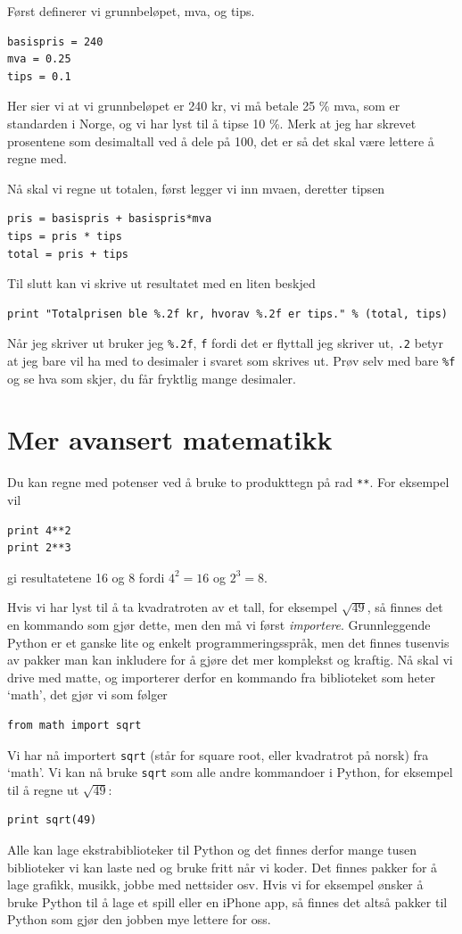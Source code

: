 \documentclass[a4paper, 11pt, notitlepage]{article}
\begin{document}
Først definerer vi grunnbeløpet, mva, og tips. 
\begin{lstlisting}
basispris = 240
mva = 0.25
tips = 0.1
\end{lstlisting}
Her sier vi at vi grunnbeløpet er 240 kr, vi må betale 25 \% mva, som er standarden i Norge, og vi har lyst til å tipse 10 \%. Merk at jeg har skrevet prosentene som desimaltall ved å dele på 100, det er så det skal være lettere å regne med.

Nå skal vi regne ut totalen, først legger vi inn mvaen, deretter tipsen
\begin{lstlisting}
pris = basispris + basispris*mva
tips = pris * tips
total = pris + tips
\end{lstlisting}

Til slutt kan vi skrive ut resultatet med en liten beskjed
\begin{lstlisting}
print "Totalprisen ble %.2f kr, hvorav %.2f er tips." % (total, tips)
\end{lstlisting}
Når jeg skriver ut bruker jeg \verb+%.2f+, \verb+f+ fordi det er flyttall jeg skriver ut, \verb+.2+ betyr at jeg bare vil ha med to desimaler i svaret som skrives ut. Prøv selv med bare \verb+%f+ og se hva som skjer, du får fryktlig mange desimaler.

\section*{Mer avansert matematikk}

Du kan regne med potenser ved å bruke to produkttegn på rad \verb+**+. For eksempel vil
\begin{lstlisting}
print 4**2
print 2**3
\end{lstlisting}
gi resultatetene 16 og 8 fordi $4^2=16$ og $2^3 = 8$.

Hvis vi har lyst til å ta kvadratroten av et tall, for eksempel $\sqrt{49}$, så finnes det en kommando som gjør dette, men den må vi først \emph{importere}. Grunnleggende Python er et ganske lite og enkelt programmeringsspråk, men det finnes tusenvis av pakker man kan inkludere for å gjøre det mer komplekst og kraftig. Nå skal vi drive med matte, og importerer derfor en kommando fra biblioteket som heter `math', det gjør vi som følger
\begin{lstlisting}
from math import sqrt
\end{lstlisting}
Vi har nå importert \verb+sqrt+ (står for square root, eller kvadratrot på norsk) fra `math'. Vi kan nå bruke \verb+sqrt+ som alle andre kommandoer i Python, for eksempel til å regne ut $\sqrt{49}$:
\begin{lstlisting}
print sqrt(49)
\end{lstlisting}
Alle kan lage ekstrabiblioteker til Python og det finnes derfor mange tusen biblioteker vi kan laste ned og bruke fritt når vi koder. Det finnes pakker for å lage grafikk, musikk, jobbe med nettsider osv. Hvis vi for eksempel ønsker å bruke Python til å lage et spill eller en iPhone app, så finnes det altså pakker til Python som gjør den jobben mye lettere for oss.
\end{document}
